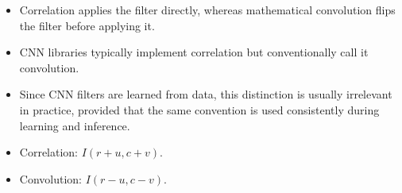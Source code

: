 \newpage

\begin{takeawaysbox}
    \begin{itemize}
        \item Correlation applies the filter directly, whereas mathematical convolution flips the filter before applying it.
        \item CNN libraries typically implement correlation but conventionally call it convolution.
        \item Since CNN filters are learned from data, this distinction is usually irrelevant in practice, provided that the same convention is used consistently during learning and inference.
        \item Correlation: $I(r + u, c + v)$.
        \item Convolution: $I(r - u, c - v)$.
    \end{itemize}
\end{takeawaysbox}